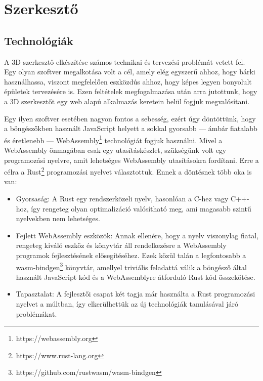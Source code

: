 \section{Szerkesztő}

\subsection{Technológiák}

A 3D szerkesztő elkészítése számos technikai és tervezési problémát vetett fel. Egy olyan szoftver
megalkotása volt a cél, amely elég egyszerű ahhoz, hogy bárki használhassa, viszont megfelelően
eszközdús ahhoz, hogy képes legyen bonyolult épületek tervezésére is. Ezen feltételek
megfogalmazása után arra jutottunk, hogy a 3D szerkesztőt egy web alapú alkalmazás keretein belül
fogjuk megvalósítani.

Egy ilyen szoftver esetében nagyon fontos a sebesség, ezért úgy döntöttünk, hogy a
böngészőkben használt JavaScript helyett a sokkal gyorsabb --- ámbár fiatalabb és éretlenebb ---
WebAssembly\footnote{https://webassembly.org} technológiát fogjuk használni. Mivel a WebAssembly
önmagában csak egy utasításkészlet, szükségünk volt egy programozási nyelvre, amit lehetséges
WebAssembly utasításokra fordítani. Erre a célra a Rust\footnote{https://www.rust-lang.org}
programozási nyelvet választottuk. Ennek a döntésnek több oka is van:

\begin{itemize}
      \item Gyorsaság: A Rust egy rendszerközeli nyelv, hasonlóan a C-hez vagy C++-hoz, így rengeteg
            olyan optimalizáció valósítható meg, ami magasabb szintű nyelvekben nem lehetséges.

      \item Fejlett WebAssembly eszközök: Annak ellenére, hogy a nyelv viszonylag fiatal, rengeteg
            kiváló eszköz és könyvtár áll rendelkezésre a WebAssembly programok fejlesztésének
            elősegítéséhez. Ezek közül talán a legfontosabb a
            wasm-bindgen\footnote{https://github.com/rustwasm/wasm-bindgen} könyvtár, amellyel
            triviális feladattá válik a böngésző által használt JavaScript kód és a WebAssemblyre
            átforduló Rust kód összekötése.

      \item Tapasztalat: A fejlesztői csapat két tagja már használta a Rust programozási nyelvet a
            múltban, így elkerülhettük az új technológiák tanulásával járó problémákat.
\end{itemize}

